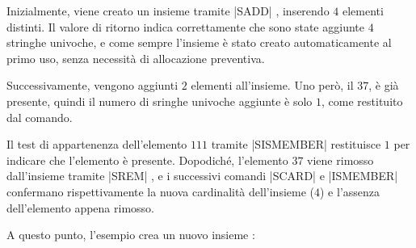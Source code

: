 Inizialmente, viene creato un insieme tramite \cverb|SADD| , inserendo $4$ elementi
distinti. Il valore di ritorno indica correttamente che sono state aggiunte $4$ stringhe univoche, e
come sempre l'insieme è stato creato automaticamente al primo uso, senza necessità di allocazione
preventiva.

\begin{center}
\end{center}

Successivamente, vengono aggiunti $2$ elementi all'insieme. Uno però, il $37$, è già presente,
quindi il numero di sringhe univoche aggiunte è solo $1$, come restituito dal comando.

\begin{center}
\end{center}

Il test di appartenenza dell'elemento $111$ tramite \cverb|SISMEMBER|  restituisce $1$ per 
indicare che l'elemento è presente. Dopodiché, l'elemento $37$ viene rimosso dall'insieme tramite
\cverb|SREM| , e i successivi comandi \cverb|SCARD| e \cverb|ISMEMBER| confermano 
rispettivamente la nuova cardinalità dell'insieme ($4$) e l'assenza dell'elemento appena rimosso.

\begin{center}
\end{center}

A questo punto, l'esempio crea un nuovo insieme : 

